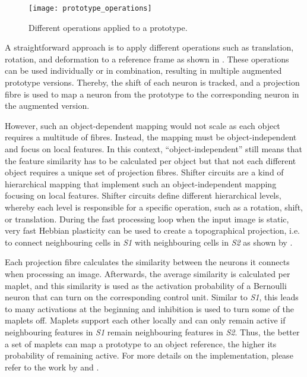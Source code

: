 \begin{figure}[h]
    \centering
    \texttt{[image: prototype\_operations]}
    \caption[Operations applied to a prototype]{Different operations applied to a prototype.}
\end{figure}
A straightforward approach is to apply different operations such as translation, rotation, and deformation to a reference frame as shown in . These operations can be used individually or in combination, resulting in multiple augmented prototype versions.
Thereby, the shift of each neuron is tracked, and a projection fibre is used to map a neuron from the prototype to the corresponding neuron in the augmented version.

However, such an object-dependent mapping would not scale as each object requires a multitude of fibres.
Instead, the mapping must be object-independent and focus on local features.
In this context, ``object-independent'' still means that the feature similarity has to be calculated per object but that not each different object requires a unique set of projection fibres.
Shifter circuits  are a kind of hierarchical mapping that implement such an object-independent mapping focusing on local features.
Shifter circuits define different hierarchical levels, whereby each level is responsible for a specific operation, such as a rotation, shift, or translation.
During the fast processing loop when the input image is static, very fast Hebbian plasticity  can be used to create a topographical projection, i.e. to connect neighbouring cells in \emph{S1} with neighbouring cells in \emph{S2} as shown by .

Each projection fibre calculates the similarity between the neurons it connects when processing an image.
Afterwards, the average similarity is calculated per maplet, and this similarity is used as the activation probability of a Bernoulli neuron that can turn on the corresponding control unit.
Similar to \emph{S1}, this leads to many activations at the beginning and inhibition is used to turn some of the maplets off.
Maplets support each other locally and can only remain active if neighbouring features in \emph{S1} remain neighbouring features in \emph{S2}.
Thus, the better a set of maplets can map a prototype to an object reference, the higher its probability of remaining active.
For more details on the implementation, please refer to the work by  and .


